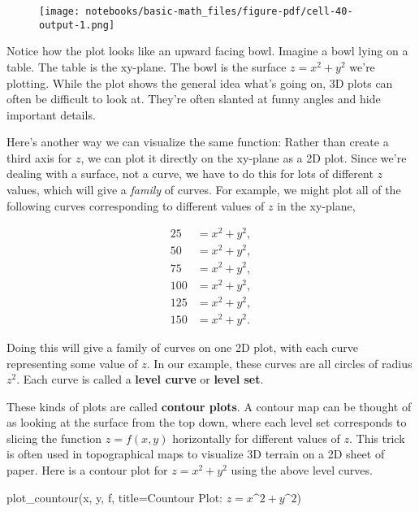 \documentclass[
  letterpaper,
  DIV=11,
  numbers=noendperiod]{scrreprt}
\newenvironment{Shaded}{\begin{snugshade}}{\end{snugshade}}
\newcommand{\NormalTok}[1]{\textcolor[rgb]{0.00,0.23,0.31}{#1}}
\newcommand{\OperatorTok}[1]{\textcolor[rgb]{0.37,0.37,0.37}{#1}}
\newcommand{\StringTok}[1]{\textcolor[rgb]{0.13,0.47,0.30}{#1}}
\begin{document}
\begin{figure}[H]

{\centering \texttt{[image: notebooks/basic-math\_files/figure-pdf/cell-40-output-1.png]}

}

\end{figure}

Notice how the plot looks like an upward facing bowl. Imagine a bowl
lying on a table. The table is the xy-plane. The bowl is the surface
\(z=x^2+y^2\) we're plotting. While the plot shows the general idea
what's going on, 3D plots can often be difficult to look at. They're
often slanted at funny angles and hide important details.

Here's another way we can visualize the same function: Rather than
create a third axis for \(z\), we can plot it directly on the xy-plane
as a 2D plot. Since we're dealing with a surface, not a curve, we have
to do this for lots of different \(z\) values, which will give a
\emph{family} of curves. For example, we might plot all of the following
curves corresponding to different values of \(z\) in the xy-plane,

\begin{align}
25 &= x^2 + y^2, \\
50 &= x^2 + y^2, \\
75 &= x^2 + y^2, \\
100 &= x^2 + y^2, \\
125 &= x^2 + y^2, \\
150 &= x^2 + y^2.
\end{align}

Doing this will give a family of curves on one 2D plot, with each curve
representing some value of \(z\). In our example, these curves are all
circles of radius \(z^2\). Each curve is called a \textbf{level curve}
or \textbf{level set}.

These kinds of plots are called \textbf{contour plots}. A contour map
can be thought of as looking at the surface from the top down, where
each level set corresponds to slicing the function \(z=f(x,y)\)
horizontally for different values of \(z\). This trick is often used in
topographical maps to visualize 3D terrain on a 2D sheet of paper. Here
is a contour plot for \(z=x^2+y^2\) using the above level curves.

\begin{Shaded}
\begin{Highlighting}[]
\NormalTok{plot\_countour(x, y, f, title}\OperatorTok{=}\StringTok{\textquotesingle{}Countour Plot: $z=x\^{}2+y\^{}2$\textquotesingle{}}\NormalTok{)}
\end{Highlighting}
\end{Shaded}
\end{document}
